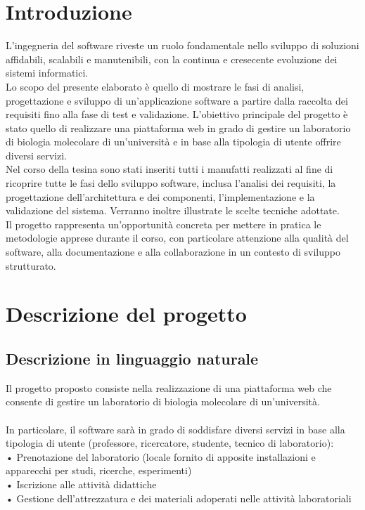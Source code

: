 \documentclass[11pt,a4paper]{report}
\begin{document}
\chapter*{Introduzione}
L’ingegneria del software riveste un ruolo fondamentale nello sviluppo di soluzioni affidabili, scalabili e manutenibili, con la 
continua e cresecente evoluzione dei sistemi informatici. \\ Lo scopo del presente elaborato è quello di mostrare le fasi di analisi, 
progettazione e sviluppo di un'applicazione software a partire dalla raccolta dei requisiti fino alla fase di test e validazione.
L'obiettivo principale del progetto è stato quello di realizzare una piattaforma web in grado di gestire un laboratorio di biologia 
molecolare di un'università e in base alla tipologia di utente offrire diversi servizi.\\ Nel corso della tesina sono stati inseriti tutti i 
manufatti realizzati al fine di ricoprire tutte le fasi dello sviluppo software, inclusa l'analisi dei requisiti, la progettazione 
dell’architettura e dei componenti, 
l’implementazione e la validazione del sistema. Verranno inoltre illustrate le scelte tecniche adottate.\\ Il progetto rappresenta 
un'opportunità concreta per mettere in pratica le metodologie apprese durante il corso, con particolare attenzione alla qualità del 
software, alla documentazione e alla collaborazione in un contesto di sviluppo strutturato.


\chapter{Descrizione del progetto}
\section{Descrizione in linguaggio naturale}
Il progetto proposto consiste nella realizzazione di una piattaforma web che consente di gestire un laboratorio di biologia molecolare di un’università.
\\\\In particolare, il software sarà in grado di soddisfare diversi servizi in base alla tipologia di utente (professore, ricercatore, studente, tecnico di laboratorio): \\
•	Prenotazione del laboratorio (locale fornito di apposite installazioni e apparecchi per studi, ricerche, esperimenti)\\
•	Iscrizione alle attività didattiche\\
•	Gestione dell’attrezzatura e dei materiali adoperati nelle attività laboratoriali
\end{document}

